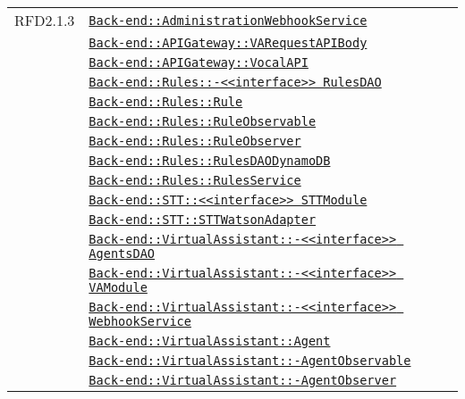 \begin{longtable}{|>{\centering}m{3cm}|m{10cm}<{\centering}|}
RFD2.1.3 & \hyperref[Back-end::AdministrationWebhookService]{\texttt{Back-end::AdministrationWebhookService}}\\
& \hyperref[Back-end::APIGateway::VARequestAPIBody]{\texttt{Back-end::APIGateway::VARequestAPIBody}}\\
& \hyperref[Back-end::APIGateway::VocalAPI]{\texttt{Back-end::APIGateway::VocalAPI}}\\
& \hyperref[Back-end::Rules::<<interface>> RulesDAO]{\texttt{Back-end::Rules::-\linebreak <<interface>> RulesDAO}}\\
& \hyperref[Back-end::Rules::Rule]{\texttt{Back-end::Rules::Rule}}\\
& \hyperref[Back-end::Rules::RuleObservable]{\texttt{Back-end::Rules::RuleObservable}}\\
& \hyperref[Back-end::Rules::RuleObserver]{\texttt{Back-end::Rules::RuleObserver}}\\
& \hyperref[Back-end::Rules::RulesDAODynamoDB]{\texttt{Back-end::Rules::RulesDAODynamoDB}}\\
& \hyperref[Back-end::Rules::RulesService]{\texttt{Back-end::Rules::RulesService}}\\
& \hyperref[Back-end::STT::<<interface>> STTModule]{\texttt{Back-end::STT::<<interface>> STTModule}}\\
& \hyperref[Back-end::STT::STTWatsonAdapter]{\texttt{Back-end::STT::STTWatsonAdapter}}\\
& \hyperref[Back-end::VirtualAssistant::<<interface>> AgentsDAO]{\texttt{Back-end::VirtualAssistant::-\linebreak <<interface>> AgentsDAO}}\\
& \hyperref[Back-end::VirtualAssistant::<<interface>> VAModule]{\texttt{Back-end::VirtualAssistant::-\linebreak <<interface>> VAModule}}\\
& \hyperref[Back-end::VirtualAssistant::<<interface>> WebhookService]{\texttt{Back-end::VirtualAssistant::-\linebreak <<interface>> WebhookService}}\\
& \hyperref[Back-end::VirtualAssistant::Agent]{\texttt{Back-end::VirtualAssistant::Agent}}\\
& \hyperref[Back-end::VirtualAssistant::AgentObservable]{\texttt{Back-end::VirtualAssistant::-\linebreak AgentObservable}}\\
& \hyperref[Back-end::VirtualAssistant::AgentObserver]{\texttt{Back-end::VirtualAssistant::-\linebreak AgentObserver}}\\

\end{longtable}
